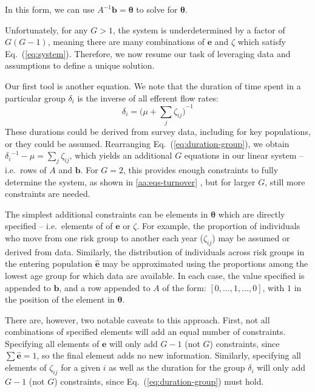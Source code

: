 In this form, we can use $A^{-1}\bm{b} = \bm{\theta}$ to solve for $\bm{\theta}$.
\par
Unfortunately, for any $G > 1$, the system is underdetermined by a factor of $G(G-1)$,
meaning there are many combinations of $\bm{e}$ and $\zeta$ which satisfy Eq.~(\ref{eq:system}).
Therefore, we now resume our task of leveraging data and assumptions
to define a unique solution.
\par
Our first tool is another equation.
We note that the duration of time spent in a particular group $\delta_i$
is the inverse of all efferent flow rates:
\begin{equation}\label{eq:duration-group}
\delta_i = {\bigg(\mu + \sum_{j}{\zeta_{ij}}\bigg)}^{-1}
\end{equation}
These durations could be derived from survey data, including for key populations,
or they could be assumed.
Rearranging Eq.~(\ref{eq:duration-group}), we obtain
${\delta_i}^{-1} - \mu = \sum_{j}{\zeta_{ij}}$,
which yields an additional $G$ equations in our linear system -- i.e.\ rows of $A$ and $\bm{b}$.
For $G = 2$, this provides enough constraints to fully determine the system,
as shown in \ref{aa:eqs-turnover} ,
but for larger $G$, still more constraints are needed.
\par
The simplest additional constraints can be elements in $\bm{\theta}$ which are directly specified
-- i.e.\ elements of of $\bm{e}$ or $\zeta$.
For example, the proportion of individuals who
move from one risk group to another each year ($\zeta_{ij}$)
may be assumed or derived from data.
Similarly, the distribution of individuals
across risk groups in the entering population $\bm{\hat{e}}$
may be approximated using the proportions among
the lowest age group for which data are available.
In each case, the value specified is appended to $\bm{b}$,
and a row appended to $A$ of the form: $[0,\dots,1,\dots,0]$,
with $1$ in the position of the element in $\bm{\theta}$.
\par
There are, however, two notable caveats to this approach.
First, not all combinations of specified elements will add an equal number of constraints.
Specifying all elements of $\bm{e}$
will only add $G-1$ (not $G$) constraints,
since $\sum \bm{\hat{e}} = 1$, so the final element adds no new information.
Similarly, specifying all elements of $\zeta_{ij}$ for a given $i$
as well as the duration for the group $\delta_i$
will only add $G-1$ (not $G$) constraints,
since Eq.~(\ref{eq:duration-group}) must hold.
